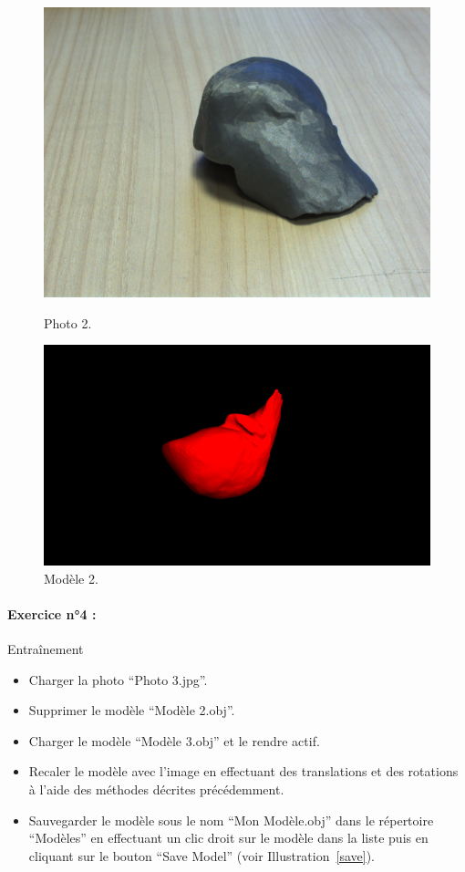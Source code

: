 \documentclass[12pt]{report}
\begin{document}
\begin{appendices}
\begin{figure}[H]
\centerline{\includegraphics[scale = 0.1]{img/Photo2.jpg}}
\caption{Photo 2.}
\endminipage\hfill
{}
\centerline{\includegraphics[scale = 0.22]{img/Model2.png}}
\caption{Modèle 2.}
\endminipage
\end{figure}

\paragraph{Exercice n°4 :}Entraînement
\begin{itemize}
\item Charger la photo ``Photo 3.jpg''.
\item Supprimer le modèle ``Modèle 2.obj''.
\item Charger le modèle ``Modèle 3.obj'' et le rendre actif.
\item Recaler le modèle avec l'image en effectuant des translations et des rotations à l'aide des méthodes décrites précédemment.
\item Sauvegarder le modèle sous le nom ``Mon Modèle.obj'' dans le répertoire ``Modèles'' en effectuant un clic droit sur le modèle dans la liste puis en cliquant sur le bouton ``Save Model'' (voir Illustration~\ref{save}).
\end{itemize}



\end{appendices}
\end{document}
